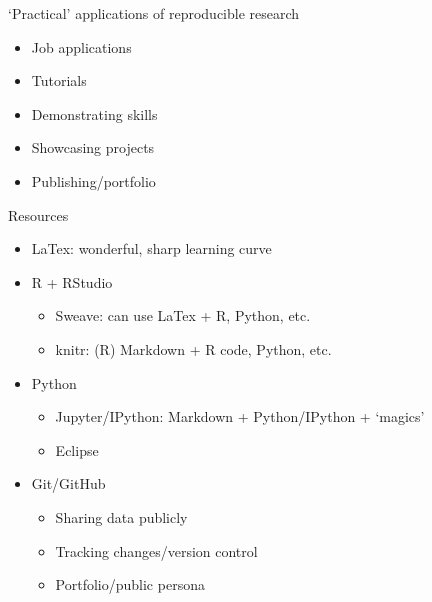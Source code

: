 \documentclass[ignorenonframetext,]{beamer}
\begin{document}
\begin{frame}{`Practical' applications of reproducible research}

\begin{itemize}
\itemsep1pt\parskip0pt
\item
  Job applications
\item
  Tutorials
\item
  Demonstrating skills
\item
  Showcasing projects
\item
  Publishing/portfolio
\end{itemize}

\end{frame}

\begin{frame}{Resources}

\begin{itemize}
\itemsep1pt\parskip0pt
\item
  LaTex: wonderful, sharp learning curve
\item
  R + RStudio

  \begin{itemize}
  \itemsep1pt\parskip0pt
  \item
    Sweave: can use LaTex + R, Python, etc.\\
  \item
    knitr: (R) Markdown + R code, Python, etc.\\
  \end{itemize}
\item
  Python

  \begin{itemize}
  \itemsep1pt\parskip0pt
  \item
    Jupyter/IPython: Markdown + Python/IPython + `magics'\\
  \item
    Eclipse\\
  \end{itemize}
\item
  Git/GitHub

  \begin{itemize}
  \itemsep1pt\parskip0pt
  \item
    Sharing data publicly
  \item
    Tracking changes/version control\\
  \item
    Portfolio/public persona
  \end{itemize}
\end{itemize}

\end{frame}
\end{document}
